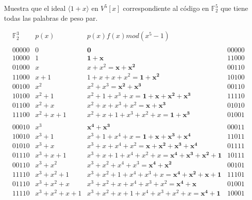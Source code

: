 \begin{frame}  \small \begin{ejercicio}

Muestra que el ideal $\langle 1+x \rangle$ en $V^5[x]$ correspondiente al código en $\mathbb{F}_2^5$ que tiene todas las palabras de peso par.


\end{ejercicio}
\end{frame} 

\begin{frame}  \tiny
\[
    \begin{array}{cccl}
					 \mathbb{F}_2^3 & p(x) &  p(x)f(x) mod (x^5-1)  \\ 
					        &     &  &\\ 
00000 & 0 & \mathbf{0} 																						&00000\\
10000 & 1 & \mathbf{1+x}																					&11000\\
01000 & x & x+x^2=\mathbf{x+x^2}																	&00110\\
11000 & x+1 & 1+x+x+x^2 =\mathbf {1+x^2}													&10100 \\
00100 & x^2 & x^2+x^3 = \mathbf {x^2+x^3} 													&00110\\
10100 & x^2+1 & x^2+1+x^3+x =\mathbf {1+x+x^2+x^3}								&11110\\
01100 & x^2+x & x^2+x+x^3+x^2=\mathbf {x+x^3} 										&01010 \\
11100 & x^2+x+1 & x^2+x+1+x^3+x^2+x =\mathbf {1+x^3}						&01001 \\
& & &\\

00010 & x^3 & \mathbf{x^4+x^3}	& 																	00011\\
10010 & x^3+1 & x^3+1+x^4+x=\mathbf{1+x+x^3+x^4}& 							11011\\
01010 & x^3+x & x^3+x+x^4+x^2=\mathbf{x+x^2+x^3+x^4}&						01111\\
01110 & x^3+x+1 & x^3+x+1+x^4+x^2+x =\mathbf {x^4+x^3+x^2+1} &	10111 \\
00110 & x^3+x^2 & x^3+x^2+x^4+x^3 = \mathbf {x^4+x^2} &						00101\\
11110 & x^3+x^2+1 & x^3+x^2+1+x^4+x^3+x =\mathbf {x^4+x^2+x+1} &11101\\
01110 & x^3+x^2+x & x^3+x^2+x+x^4+x^3+x^2=\mathbf {x^4+x} 			&01001 \\
11110 & x^3+x^2+x+1 & x^3+x^2+x+1+x^4+x^3+x^2+x =\mathbf {x^4+1} &10001 \\
& & &\\

	\end{array}	    		
\]
\end{frame} 



